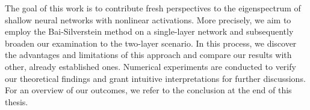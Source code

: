 \documentclass{article}
\begin{document}
\bigskip
\par
The goal of this work is to contribute fresh perspectives to the eigenspectrum of shallow neural networks with nonlinear activations. More precisely, we aim to employ the Bai-Silverstein method on a single-layer network and subsequently broaden our examination to the two-layer scenario. In this process, we discover the advantages and limitations of this approach and compare our results with other, already established ones. Numerical experiments are conducted to verify our theoretical findings and grant intuitive interpretations for further discussions. For an overview of our outcomes, we refer to the conclusion at the end of this thesis.
\par
\end{document}
